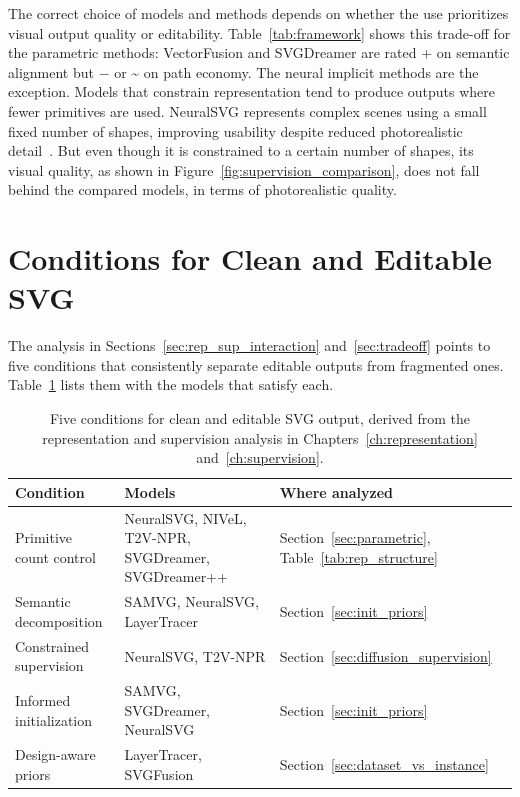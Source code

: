 The correct choice of models and methods depends 
on whether the use prioritizes visual output quality 
or editability. Table~\ref{tab:framework} shows this trade-off 
for the parametric methods: VectorFusion and SVGDreamer are rated 
+ on semantic alignment but $-$ or \textasciitilde{} on path economy. 
The neural implicit methods are the exception.
Models that constrain representation tend to produce outputs where fewer primitives are used. 
NeuralSVG represents complex scenes using a small 
fixed number of shapes, improving usability despite reduced 
photorealistic detail~\cite{polaczekNeuralSVGImplicitRepresentation2025}. 
But even though it is constrained to a certain number of shapes, 
its visual quality, as shown in Figure~\ref{fig:supervision_comparison}, 
does not fall behind the compared models, in terms of photorealistic quality.


\section{Conditions for Clean and Editable SVG}
\label{sec:conditions}

The analysis in Sections~\ref{sec:rep_sup_interaction} 
and~\ref{sec:tradeoff} points to five conditions that 
consistently separate editable outputs from fragmented 
ones. Table~\ref{tab:conditions} lists them with the 
models that satisfy each.

\begin{table}[htbp]
\centering
\caption{Five conditions for clean and editable SVG 
output, derived from the representation and supervision 
analysis in Chapters~\ref{ch:representation} 
and~\ref{ch:supervision}.}
\label{tab:conditions}
\small
\begin{tabularx}{\textwidth}{>{\raggedright\arraybackslash}p{3.6cm} >{\raggedright\arraybackslash}X >{\raggedright\arraybackslash}p{4.2cm}}
\hline
\textbf{Condition} & \textbf{Models} & \textbf{Where analyzed} \\
\hline
Primitive count control & NeuralSVG, NIVeL, T2V-NPR, SVGDreamer, SVGDreamer++ & Section~\ref{sec:parametric}, Table~\ref{tab:rep_structure} \\
Semantic decomposition & SAMVG, NeuralSVG, LayerTracer & Section~\ref{sec:init_priors} \\
Constrained supervision & NeuralSVG, T2V-NPR & Section~\ref{sec:diffusion_supervision} \\
Informed initialization & SAMVG, SVGDreamer, NeuralSVG & Section~\ref{sec:init_priors} \\
Design-aware priors & LayerTracer, SVGFusion & Section~\ref{sec:dataset_vs_instance} \\
\hline
\end{tabularx}
\end{table}

